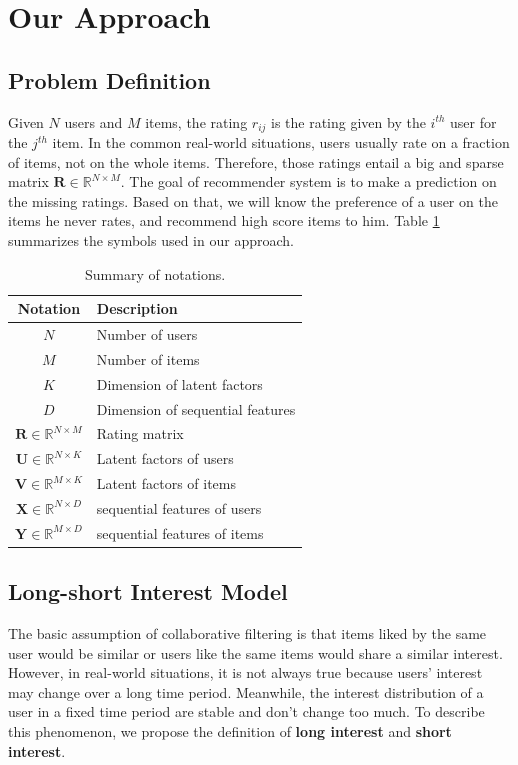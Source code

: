 \documentclass{llncs}
\begin{document}
\section{Our Approach}
\subsection{Problem Definition}
Given $N$ users and $M$ items, the rating $r_{ij}$ is the rating given by
the $i^{th}$ user for the $j^{th}$ item.
In the common real-world situations,
users usually rate on a fraction of items, not on the whole items.
Therefore,
those ratings entail a big and sparse matrix $\mathbf{R} \in \mathbb{R}^{N \times M}$.
The goal of recommender system is to make a prediction on the missing ratings.
Based on that, we will know the preference of a user on the items he never rates,
and recommend high score items to him.
Table \ref{tab:notations} summarizes the symbols used in our approach.

\begin{table}[htbp]
	\centering
	\caption{Summary of notations.}
	\label{tab:notations}
	\begin{tabular}{|c|l|}
		\hline
		\textbf{Notation} & \textbf{Description} \\
		\hline
		$N$ & Number of users \\
		$M$ & Number of items \\
		$K$ & Dimension of latent factors \\
		$D$ & Dimension of sequential features \\
		$\mathbf{R} \in \mathbb{R}^{N \times M}$ & Rating matrix \\
		$\mathbf{U} \in \mathbb{R}^{N \times K}$ & Latent factors of users \\
		$\mathbf{V} \in \mathbb{R}^{M \times K}$ & Latent factors of items \\
		$\mathbf{X} \in \mathbb{R}^{N \times D}$ & sequential features of users \\
		$\mathbf{Y} \in \mathbb{R}^{M \times D}$ & sequential features of items \\
		\hline
	\end{tabular}
\end{table}

\subsection{Long-short Interest Model}
The basic assumption of collaborative filtering is that items liked by the same user
would be similar or users like the same items would share a similar interest.
However, in real-world situations, it is not always true because users' interest
may change over a long time period.
Meanwhile, the interest distribution of a user in a fixed time period
are stable and don't change too much.
To describe this phenomenon,
we propose the definition of \textbf{long interest} and \textbf{short interest}.
\end{document}
